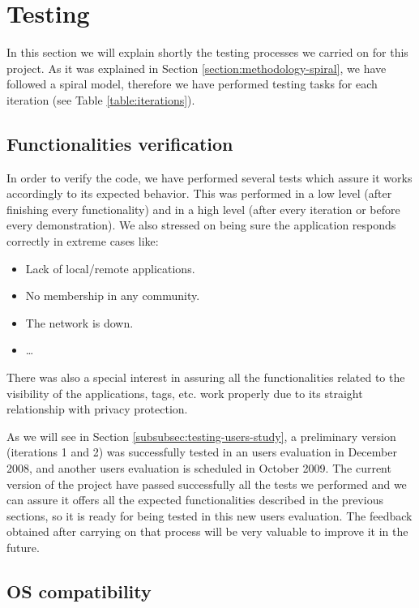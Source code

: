 \section{Testing}
\label{sec:testing}

In this section we will explain shortly the testing processes we carried on for
this project. As it was explained in Section \ref{section:methodology-spiral}, we have followed a spiral model,
therefore we have performed testing tasks for each iteration (see Table
\ref{table:iterations}).

\subsection{Functionalities verification}

In order to verify the code, we have performed several tests which assure it
works accordingly to its expected behavior. This was performed in a low
level (after finishing every functionality) and in a high level (after every
iteration or before every demonstration). We also stressed on being sure the
application responds correctly in extreme cases like:
\begin{itemize}
  \item Lack of local/remote applications.
  \item No membership in any community.
  \item The network is down.
  \item \ldots
\end{itemize}

There was also a special interest in assuring all the functionalities related
to the visibility of the applications, tags, etc. work properly due to its
straight relationship with privacy protection.

As we will see in Section \ref{subsubsec:testing-users-study}, a preliminary
version (iterations 1 and 2) was successfully tested in an
users evaluation in December 2008, and another users evaluation is scheduled
in October 2009. The current version of the project have passed successfully
all the tests we performed and we can assure it offers all the expected
functionalities described in the previous sections, so it is ready for being
tested in this new users evaluation. The feedback obtained after carrying on
that process will be very valuable to improve it in the future.

\subsection{OS compatibility}


